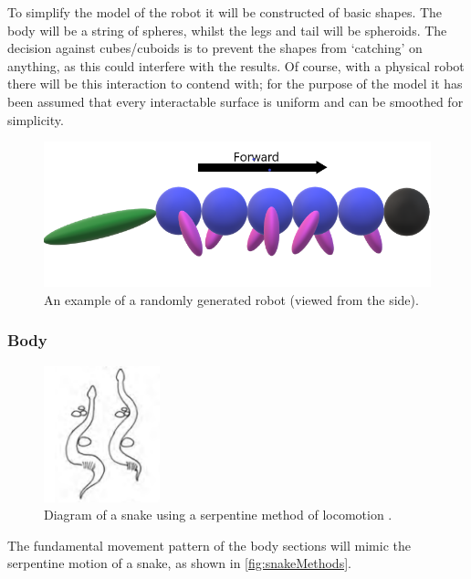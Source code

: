 \documentclass{article}
\begin{document}
To simplify the model of the robot it will be constructed of basic shapes. The body will be a string of spheres, whilst the legs and tail will be spheroids. The decision against cubes/cuboids is to prevent the shapes from ‘catching’ on anything, as this could interfere with the results. Of course, with a physical robot there will be this interaction to contend with; for the purpose of the model it has been assumed that every interactable surface is uniform and can be smoothed for simplicity. \\

\begin{figure}[H]
\centering
\includegraphics[scale=0.5]{robotDesign}
\caption{An example of a randomly generated robot (viewed from the side).}
\end{figure}

\newpage
\subsubsection{Body}
\label{sec:Body Movement}
\begin{figure}
    \centering
    \vspace*{-5mm}
    \includegraphics[width=0.3\textwidth]{serpentine}
    \vspace*{-7mm}
\caption{Diagram of a snake using a serpentine method of locomotion \citep{reptileLocomotion}.}
    \label{fig:snakeMethods}
\end{figure}
The fundamental movement pattern of the body sections will mimic the serpentine motion of a snake, as shown in \autoref{fig:snakeMethods}.\\
\end{document}
